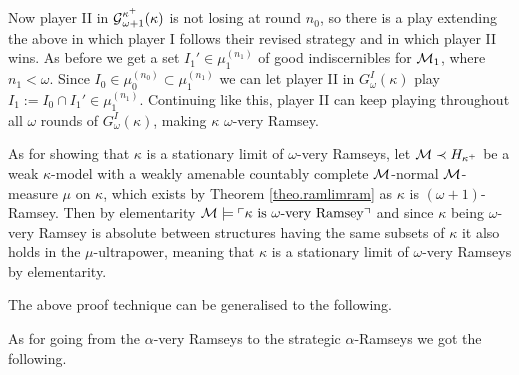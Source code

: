 \documentclass[../main]{subfiles}
\begin{document}
{	

	Now player II in $\operatorname{\mathcal G}_{\omega+1}^{\kappa^+}(\kappa)$ is not losing at round $n_0$, so there is a play extending the above in which player I follows their revised strategy and in which player II wins. As before we get a set $I_1'\in\mu_1^{(n_1)}$ of good indiscernibles for $\operatorname{\mathcal M}_1$, where $n_1<\omega$. Since $I_0\in\mu_0^{(n_0)}\subset\mu_1^{(n_1)}$ we can let player II in $G_\omega^I(\kappa)$ play $I_1:=I_0\cap I_1'\in\mu_1^{(n_1)}$. Continuing like this, player II can keep playing throughout all $\omega$ rounds of $G_\omega^I(\kappa)$, making $\kappa$ $\omega$-very Ramsey.

	\qquad As for showing that $\kappa$ is a stationary limit of $\omega$-very Ramseys, let $\operatorname{\mathcal M}\prec H_{\kappa^+}$ be a weak $\kappa$-model with a weakly amenable countably complete $\operatorname{\mathcal M}$-normal $\operatorname{\mathcal M}$-measure $\mu$ on $\kappa$, which exists by Theorem \ref{theo.ramlimram} as $\kappa$ is $(\omega{+}1)$-Ramsey. Then by elementarity $\operatorname{\mathcal M}\models\ulcorner \kappa\text{ is $\omega$-very Ramsey} \urcorner$ and since $\kappa$ being $\omega$-very Ramsey is absolute between structures having the same subsets of $\kappa$ it also holds in the $\mu$-ultrapower, meaning that $\kappa$ is a stationary limit of $\omega$-very Ramseys by elementarity. 
}

The above proof technique can be generalised to the following.


As for going from the $\alpha$-very Ramseys to the strategic $\alpha$-Ramseys we got the following.
\end{document}
